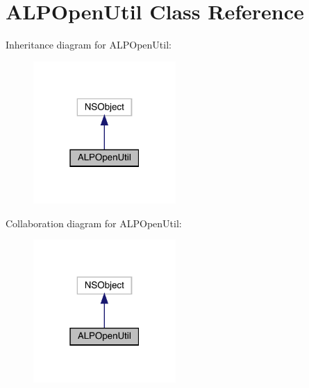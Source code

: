 \hypertarget{interface_a_l_p_open_util}{}\section{A\+L\+P\+Open\+Util Class Reference}
\label{interface_a_l_p_open_util}


Inheritance diagram for A\+L\+P\+Open\+Util\+:\nopagebreak
\begin{figure}[H]
\begin{center}
\leavevmode
\includegraphics[width=154pt]{interface_a_l_p_open_util__inherit__graph}
\end{center}
\end{figure}


Collaboration diagram for A\+L\+P\+Open\+Util\+:\nopagebreak
\begin{figure}[H]
\begin{center}
\leavevmode
\includegraphics[width=154pt]{interface_a_l_p_open_util__coll__graph}
\end{center}
\end{figure}
